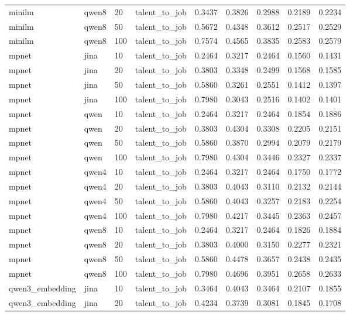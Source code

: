 \begin{table}[t]
\begin{tabular}{lllllllll}
minilm & qwen8 & 20 & talent_to_job & 0.3437 & 0.3826 & 0.2988 & 0.2189 & 0.2234 \\
minilm & qwen8 & 50 & talent_to_job & 0.5672 & 0.4348 & 0.3612 & 0.2517 & 0.2529 \\
minilm & qwen8 & 100 & talent_to_job & 0.7574 & 0.4565 & 0.3835 & 0.2583 & 0.2579 \\
mpnet & jina & 10 & talent_to_job & 0.2464 & 0.3217 & 0.2464 & 0.1560 & 0.1431 \\
mpnet & jina & 20 & talent_to_job & 0.3803 & 0.3348 & 0.2499 & 0.1568 & 0.1585 \\
mpnet & jina & 50 & talent_to_job & 0.5860 & 0.3261 & 0.2551 & 0.1412 & 0.1397 \\
mpnet & jina & 100 & talent_to_job & 0.7980 & 0.3043 & 0.2516 & 0.1402 & 0.1401 \\
mpnet & qwen & 10 & talent_to_job & 0.2464 & 0.3217 & 0.2464 & 0.1854 & 0.1886 \\
mpnet & qwen & 20 & talent_to_job & 0.3803 & 0.4304 & 0.3308 & 0.2205 & 0.2151 \\
mpnet & qwen & 50 & talent_to_job & 0.5860 & 0.3870 & 0.2994 & 0.2079 & 0.2179 \\
mpnet & qwen & 100 & talent_to_job & 0.7980 & 0.4304 & 0.3446 & 0.2327 & 0.2337 \\
mpnet & qwen4 & 10 & talent_to_job & 0.2464 & 0.3217 & 0.2464 & 0.1750 & 0.1772 \\
mpnet & qwen4 & 20 & talent_to_job & 0.3803 & 0.4043 & 0.3110 & 0.2132 & 0.2144 \\
mpnet & qwen4 & 50 & talent_to_job & 0.5860 & 0.4043 & 0.3257 & 0.2183 & 0.2254 \\
mpnet & qwen4 & 100 & talent_to_job & 0.7980 & 0.4217 & 0.3445 & 0.2363 & 0.2457 \\
mpnet & qwen8 & 10 & talent_to_job & 0.2464 & 0.3217 & 0.2464 & 0.1826 & 0.1884 \\
mpnet & qwen8 & 20 & talent_to_job & 0.3803 & 0.4000 & 0.3150 & 0.2277 & 0.2321 \\
mpnet & qwen8 & 50 & talent_to_job & 0.5860 & 0.4478 & 0.3657 & 0.2438 & 0.2435 \\
mpnet & qwen8 & 100 & talent_to_job & 0.7980 & 0.4696 & 0.3951 & 0.2658 & 0.2633 \\
qwen3_embedding & jina & 10 & talent_to_job & 0.3464 & 0.4043 & 0.3464 & 0.2107 & 0.1855 \\
qwen3_embedding & jina & 20 & talent_to_job & 0.4234 & 0.3739 & 0.3081 & 0.1845 & 0.1708 \\

\end{tabular}
\end{table}
